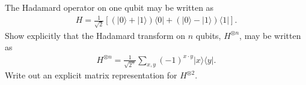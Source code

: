 \documentclass[en]{sol-man}
\begin{document}
\begin{exe}
    The Hadamard operator on one qubit may be written as
    \begin{align}
        H=\frac{1}{\sqrt{2}}\left[(\lvert 0\rangle+\lvert 1\rangle)\langle 0\rvert+(\lvert 0\rangle-\lvert 1\rangle)\langle 1\rvert\right].
    \end{align}
    Show explicitly that the Hadamard transform on $n$ qubits, $H^{\otimes n}$, may be written as
    \begin{align}
        H^{\otimes n}=\frac{1}{\sqrt{2^n}}\sum_{x,y}(-1)^{x\cdot y}\lvert x\rangle\langle y\rvert.
    \end{align}
    Write out an explicit matrix representation for $H^{\otimes 2}$.
\end{exe}

\ifx\allfiles\undefined
\end{document}
